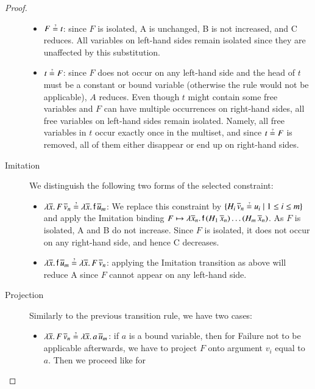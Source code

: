 \begin{proof}
\begin{description}
    \begin{itemize}
      \item $F \unif t$: since $F$ is isolated, A is unchanged, B is not
      increased, and C reduces. All variables on left-hand sides remain isolated
      since they are unaffected by this substitution.
      \item $t \unif F $: since $F$ does not occur on any left-hand side and the
      head of $t$ must be a constant or bound variable (otherwise the rule would
      not be applicable), $A$ reduces. Even though $t$ might contain some free
      variables and $F$ can have multiple occurrences on right-hand sides, all
      free variables on left-hand sides remain isolated. Namely, all free variables
      in $t$ occur exactly once in the multiset, and since $t \unif F$ is
      removed, all of them either disappear or end up on right-hand sides.
    \end{itemize}
    \item[Imitation] We distinguish the following two forms of the selected constraint:
    \begin{itemize}
      \item $\lambda \overline{x}. \, F \, \overline{v}_n \unif \lambda \overline{x}. \,
      \cst{f} \, \overline{u}_m$: 
      We replace this constraint by 
      $\{H_i \, \overline{v}_n \unif u_i \mid 1\le i\le m\}$
      and apply the \textsf{Imitation} binding
      $F \mapsto \lambda \overline{x}_n.\, \mathsf{f} \, (H_1 \, \overline{x}_n) \allowbreak
      \ldots (H_m \, \overline{x}_n)$.
      As $F$ is isolated, A and B do not increase.
      Since $F$ is isolated, it does not occur on any right-hand side, and hence C decreases.
      \item $\lambda \overline{x}. \, \cst{f} \, \overline{u}_m \unif \lambda \overline{x}. \, F \, \overline{v}_n $:
      applying the \textsf{Imitation} transition 
      as above will reduce A since $F$ cannot appear on any
      left-hand side.
    \end{itemize}
    \item[Projection] Similarly to the previous transition rule, we have two cases:
      \begin{itemize}
        \item$\lambda \overline{x}. \, F \, \overline{v}_n \unif \lambda
        \overline{x}. \, a \, \overline{u}_m$: if $a$ is a bound variable,
        then for \textsf{Failure} not to be applicable afterwards, we have to
        project $F$ onto argument $v_i$ equal to $a$. Then we proceed like for

\end{itemize}
\end{description}
\end{proof}
